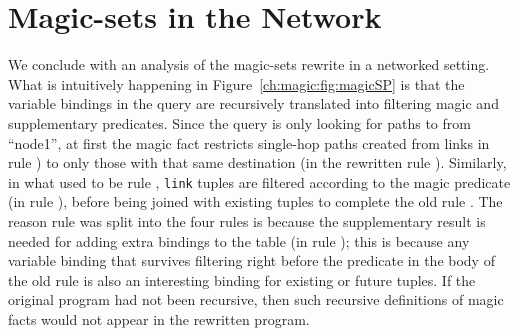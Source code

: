 
\section{Magic-sets in the Network}

We conclude with an analysis of the magic-sets rewrite in a networked setting.
What is intuitively happening in Figure~\ref{ch:magic:fig:magicSP} is that the
variable bindings in the query are recursively translated into filtering magic
and supplementary predicates.  Since the query is only looking for paths to
from ``node1'', at first the magic fact restricts single-hop paths
created from links in rule ) to only those with that same destination
(in the rewritten rule ).  Similarly, in what used to be rule
, {\tt link} tuples are filtered according to the magic predicate (in
rule ), before being joined with existing  tuples to
complete the old rule .  The reason rule  was split into the four
rules is because the supplementary result  is needed for adding
extra bindings to the  table (in rule ); this is
because any variable binding that survives filtering right before the 
predicate in the body of the old rule  is also an interesting binding
for existing or future  tuples.  If the original program had not been
recursive, then such recursive definitions of magic facts would not appear in
the rewritten program.

